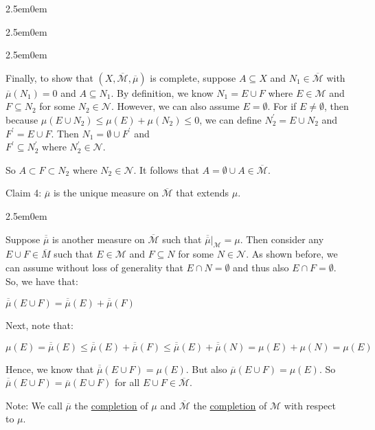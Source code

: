 \documentclass{book}
\newcommand{\exPP}{%
   \color{RedViolet}%
   \fontsize{12}{14}\selectfont%
}
\newenvironment{myIndent}{%
   \begin{adjustwidth}{2.5em}{0em}%
}{%
   \end{adjustwidth}%
}
\newcommand{\udefine}[1]{{%
   \setulcolor{Red}%
   \setul{0.14em}{0.07em}%
   \ul{#1}%
}}
\newcommand{\retTwo}{\hfill\bigbreak}
\begin{document}
\begin{myIndent}
\begin{myIndent}
\begin{myIndent}
         Finally, to show that $(X, \overline{\mathcal{M}}, \overline{\mu})$ is complete, suppose $A \subseteq X$ and $N_1 \in \overline{\mathcal{M}}$ with $\overline{\mu}(N_1) = 0$ and $A \subseteq N_1$. By definition, we know $N_1 = E \cup F$ where $E \in \mathcal{M}$ and $F \subseteq N_2$ for some $N_2 \in \mathcal{N}$. However, we can also assume $E = \emptyset$. For if $E \neq \emptyset$, then because $\mu(E \cup N_2) \leq \mu(E) + \mu(N_2) \leq 0$, we can define $N_2^\prime = E \cup N_2$ and $F^\prime = E \cup F$. Then $N_1 = \emptyset \cup F^\prime$ and\\ $F^\prime \subseteq N_2^\prime$ where $N_2^\prime \in \mathcal{N}$.\retTwo

         So $A \subset F \subset N_2$ where $N_2 \in \mathcal{N}$. It follows that $A = \emptyset \cup A \in \overline{\mathcal{M}}$.\retTwo
      \end{myIndent}

      Claim 4: $\overline{\mu}$ is the unique measure on $\overline{\mathcal{M}}$ that extends $\mu$.\\ [-9pt]
      \begin{myIndent}\exPP
         Suppose $\overline{\overline{\mu}}$ is another measure on $\overline{\mathcal{M}}$ such that $\overline{\overline{\mu}}|_\mathcal{M} = \mu$. Then consider any $E \cup F \in \overline{M}$ such that $E \in \mathcal{M}$ and $F \subseteq N$ for some $N \in \mathcal{N}$. As shown before, we can assume without loss of generality that $E \cap N = \emptyset$ and thus also $E \cap F = \emptyset$. So, we have that:

         {\centering $\overline{\overline{\mu}}(E \cup F) = \overline{\overline{\mu}}(E) + \overline{\overline{\mu}}(F)$\retTwo\par}

         Next, note that:

         {\centering\fontsize{11}{13}\selectfont $\mu(E) = \overline{\overline{\mu}}(E) \leq \overline{\overline{\mu}}(E) + \overline{\overline{\mu}}(F) \leq \overline{\overline{\mu}}(E) + \overline{\overline{\mu}}(N) = \mu(E) + \mu(N) = \mu(E)$ \retTwo\par}

         Hence, we know that $\overline{\overline{\mu}}(E \cup F) = \mu(E)$. But also $\overline{\mu}(E \cup F) = \mu(E)$. So $\overline{\overline{\mu}}(E \cup F) = \overline{\mu}(E \cup F)$ for all $E \cup F \in \overline{\mathcal{M}}$.\retTwo
      \end{myIndent}
   \end{myIndent}

   Note: We call $\overline{\mu}$ the \udefine{completion} of $\mu$ and $\overline{\mathcal{M}}$ the \udefine{completion} of $\mathcal{M}$ with respect\\ to $\mu$.
\end{myIndent}
\end{document}
